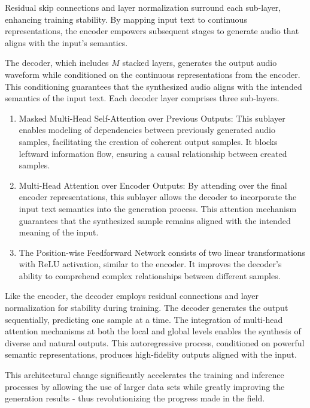 Residual skip connections and layer normalization surround each sub-layer, enhancing training stability. By mapping input text to continuous representations, the encoder empowers subsequent stages to generate audio that aligns with the input's semantics.

The decoder, which includes $M$ stacked layers, generates the output audio waveform while conditioned on the continuous representations from the encoder. This conditioning guarantees that the synthesized audio aligns with the intended semantics of the input text. Each decoder layer comprises three sub-layers.

\begin{enumerate}
    \item Masked Multi-Head Self-Attention over Previous Outputs: This sublayer enables modeling of dependencies between previously generated audio samples, facilitating the creation of coherent output samples. It blocks leftward information flow, ensuring a causal relationship between created samples.

    \item Multi-Head Attention over Encoder Outputs: By attending over the final encoder representations, this sublayer allows the decoder to incorporate the input text semantics into the generation process. This attention mechanism guarantees that the synthesized sample remains aligned with the intended meaning of the input.

    \item The Position-wise Feedforward Network consists of two linear transformations with \ac{ReLU} activation, similar to the encoder. It improves the decoder's ability to comprehend complex relationships between different samples.
\end{enumerate}

Like the encoder, the decoder employs residual connections and layer normalization for stability during training. The decoder generates the output sequentially, predicting one sample at a time. The integration of multi-head attention mechanisms at both the local and global levels enables the synthesis of diverse and natural outputs. This autoregressive process, conditioned on powerful semantic representations, produces high-fidelity outputs aligned with the input.

This architectural change significantly accelerates the training and inference processes by allowing the use of larger data sets while greatly improving the generation results - thus revolutionizing the progress made in the field.

